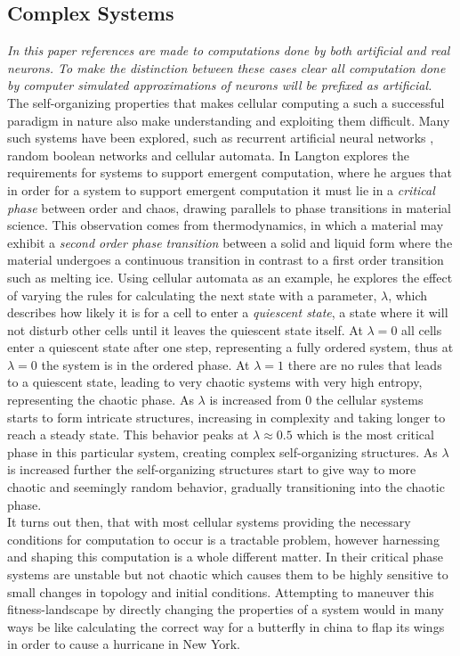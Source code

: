 \subsection{Complex Systems}
\textit{
  In this paper references are made to computations done by both artificial and real
  neurons.
  To make the distinction between these cases clear all computation done by
  computer simulated approximations of neurons will be prefixed as artificial.
}\\
The self-organizing properties that makes cellular computing a such a successful
paradigm in nature also make understanding and exploiting them difficult.
Many such systems have been explored, such as recurrent artificial neural
networks \cite{bertschinger_real-time_2004}, random boolean networks
\cite{gershenson_introduction_2004} and cellular automata.
In \cite{langton_computation_1990} Langton explores the requirements for systems
to support emergent computation, where
he argues that in order for a system to support emergent computation it must
lie in a \textit{critical phase} between order and chaos, drawing parallels to
phase transitions in material science.
This observation comes from thermodynamics, in which a material may exhibit a
\textit{second order phase transition} between a solid and liquid form where the
material undergoes a continuous transition in contrast to a first order
transition such as melting ice.
Using cellular automata as an example, he explores the effect of varying the
rules for calculating the next state with a parameter, $\lambda$, which
describes how likely it is for a cell to enter a \textit{quiescent state}, a state
where it will not disturb other cells until it leaves the quiescent state itself.
At $\lambda = 0$ all cells enter a quiescent state after one step, representing
a fully ordered system, thus at $\lambda = 0$ the system is in the ordered phase.
At $\lambda = 1$ there are no rules that leads to a quiescent state, leading to
very chaotic systems with very high entropy, representing the chaotic phase.
As $\lambda$ is increased from 0 the cellular systems starts to form intricate
structures, increasing in complexity and taking longer to reach a steady state.
This behavior peaks at $\lambda \approx 0.5$ which is the most critical phase in this
particular system, creating complex self-organizing structures.
As $\lambda$ is increased further the self-organizing structures start to give
way to more chaotic and seemingly random behavior, gradually transitioning into
the chaotic phase.\\
It turns out then, that with most cellular systems providing the necessary
conditions for computation to occur is a tractable problem, however harnessing
and shaping this computation is a whole different matter.
In their critical phase systems are unstable but not chaotic which causes them to
be highly sensitive to small changes in topology and initial conditions.
Attempting to maneuver this fitness-landscape by directly changing the
properties of a system would in many ways be like calculating the correct way
for a butterfly in china to flap its wings in order to cause a hurricane in New York.\\
